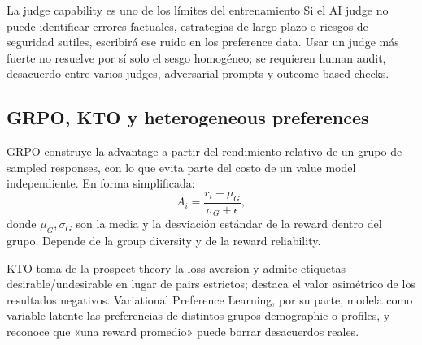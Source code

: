 


\begin{warningbox}{La judge capability es uno de los límites del entrenamiento}
Si el AI judge no puede identificar errores factuales, estrategias de largo plazo o riesgos de seguridad sutiles, escribirá ese ruido en los preference data. Usar un judge más fuerte no resuelve por sí solo el sesgo homogéneo; se requieren human audit, desacuerdo entre varios judges, adversarial prompts y outcome-based checks.
\end{warningbox}

\subsection{GRPO, KTO y heterogeneous preferences}

GRPO construye la advantage a partir del rendimiento relativo de un grupo de sampled responses, con lo que evita parte del costo de un value model independiente. En forma simplificada:
\[
A_i=\frac{r_i-\mu_G}{\sigma_G+\epsilon},
\]
donde $\mu_G,\sigma_G$ son la media y la desviación estándar de la reward dentro del grupo. Depende de la group diversity y de la reward reliability.



KTO toma de la prospect theory la loss aversion y admite etiquetas desirable/undesirable en lugar de pairs estrictos; destaca el valor asimétrico de los resultados negativos. Variational Preference Learning, por su parte, modela como variable latente las preferencias de distintos grupos demographic o profiles, y reconoce que «una reward promedio» puede borrar desacuerdos reales.





